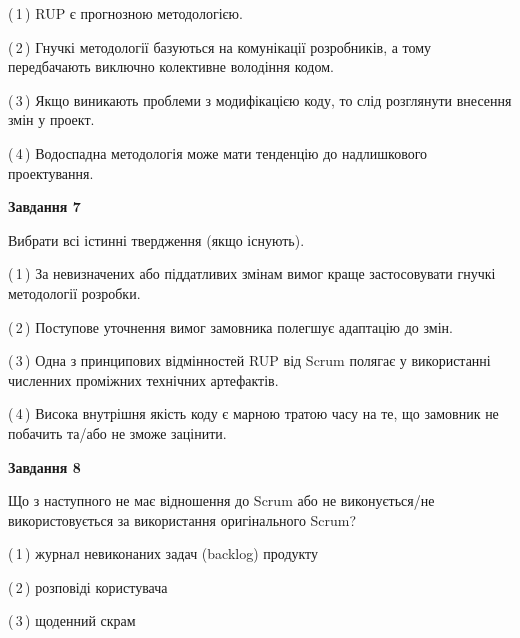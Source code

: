 \documentclass[10pt, ukrainian]{article}
\begin{document}
{\begin {large}
(\,1\,) RUP є прогнозною методологією. %



(\,2\,) Гнучкі методології базуються на комунікації розробників, а тому передбачають виключно колективне володіння кодом. %



(\,3\,) Якщо виникають проблеми з модифікацією коду, то слід розглянути внесення змін у проект. %



(\,4\,) Водоспадна методологія може мати тенденцію до надлишкового проектування. %


{\begin {center}\textbf{Завдання 7}\end {center}}\par
Вибрати всі істинні твердження (якщо існують).\par
\vspace{2mm}



(\,1\,) За невизначених або піддатливих змінам вимог краще застосовувати гнучкі методології розробки. %



(\,2\,) Поступове уточнення вимог замовника полегшує адаптацію до змін. %



(\,3\,) Одна з принципових відмінностей RUP від Scrum полягає у використанні численних проміжних технічних артефактів. %



(\,4\,) Висока внутрішня якість коду є марною тратою часу на те, що замовник не побачить та/або не зможе зацінити. %


{\begin {center}\textbf{Завдання 8}\end {center}}\par
Що з наступного не має відношення до Scrum або не виконується/не використовується за використання оригінального Scrum?\par
\vspace{2mm}



(\,1\,) журнал невиконаних задач (backlog) продукту%



(\,2\,) розповіді користувача%



(\,3\,) щоденний скрам%




\end{large}}
\end{document}
